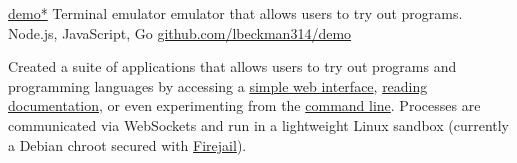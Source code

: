 \showoff
{\textcolor{my-blue}{\href{https://liambeckman.com/code/demo}{demo*}}}
{Terminal emulator emulator that allows users to try out programs.}
{Node.js, JavaScript, Go}
{\textcolor{my-blue}{\href{https://github.com/lbeckman314/demo}{github.com/lbeckman314/demo}}}

Created a suite of applications that allows users to try out programs and programming languages by accessing a \textcolor{my-blue}{\href{https://voyager-index.herokuapp.com}{simple web interface}}, \textcolor{my-blue}{\href{https://demo.liambeckman.com/docs-demonstration.html}{reading documentation}}, or even experimenting from the \textcolor{my-blue}{\href{https://github.com/lbeckman314/demo-cli.git}{command line}}. Processes are communicated via WebSockets and run in a lightweight Linux sandbox (currently a Debian chroot secured with \textcolor{my-blue}{\href{https://firejail.wordpress.com/}{Firejail}}).

